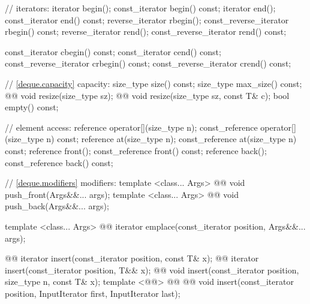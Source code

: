 \documentclass[american,twoside]{book}
\begin{document}
\begin{codeblock}
{{    // iterators:
    iterator               begin();
    const_iterator         begin() const;
    iterator               end();
    const_iterator         end() const;
    reverse_iterator       rbegin();
    const_reverse_iterator rbegin() const;
    reverse_iterator       rend();
    const_reverse_iterator rend() const;

    const_iterator         cbegin() const;
    const_iterator         cend() const;
    const_reverse_iterator crbegin() const;
    const_reverse_iterator crend() const;

    // \ref{deque.capacity} capacity:
    size_type size() const;
    size_type max_size() const;
    @@ 
      void resize(size_type sz);
    @@    
      void resize(size_type sz, const T& c);
    bool empty() const;

    // element access:
    reference       operator[](size_type n);
    const_reference operator[](size_type n) const;
    reference       at(size_type n);
    const_reference at(size_type n) const;
    reference       front();
    const_reference front() const;
    reference       back();
    const_reference back() const;

    // \ref{deque.modifiers} modifiers:
    template <class... Args> 
      @@ 
      void push_front(Args&&... args);
    template <class... Args> 
      @@ 
      void push_back(Args&&... args);

    template <class... Args> 
      @@ 
      iterator emplace(const_iterator position, Args&&... args);

    @@
      iterator insert(const_iterator position, const T& x);
    @@
      iterator insert(const_iterator position, T&& x);
    @@
      void insert(const_iterator position, size_type n, const T& x);
    template <@@>
      @@
               @@
      void insert(const_iterator position, InputIterator first, InputIterator last);

}}
\end{codeblock}
\end{document}
